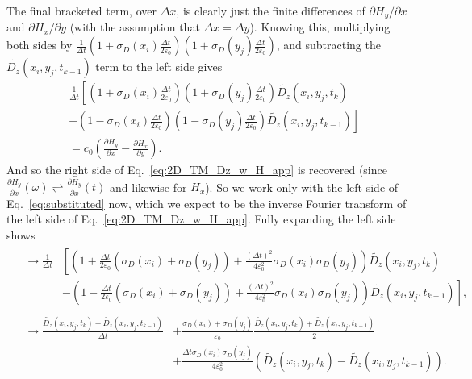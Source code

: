 \documentclass[12pt]{article}
\begin{document}
The final bracketed term, over $\Delta x$, is clearly just the finite differences of $\partial H_y/\partial x$ and $\partial H_x/\partial y$ (with the assumption that $\Delta x = \Delta y$). Knowing this, multiplying both sides by $\frac{1}{\Delta t}\left(1+\sigma_D(x_i)\frac{\Delta t}{2\varepsilon_0}\right)\left(1+\sigma_D(y_j)\frac{\Delta t}{2\varepsilon_0}\right)$, and subtracting the $\tilde{D_z}(x_i,y_j,t_{k-1})$ term to the left side gives
\begin{equation}
\label{eq:substituted}
\begin{split}
&\frac{1}{\Delta t}\left[\left(1+\sigma_D(x_i)\frac{\Delta t}{2\varepsilon_0}\right)\left(1+\sigma_D(y_j)\frac{\Delta t}{2\varepsilon_0}\right)\tilde{D_z}(x_i,y_j,t_k)\right. \\
&\left.- \left(1-\sigma_D(x_i)\frac{\Delta t}{2\varepsilon_0}\right)\left(1-\sigma_D(y_j)\frac{\Delta t}{2\varepsilon_0}\right)\tilde{D_z}(x_i,y_j,t_{k-1})\right]\\
& = c_0\left(\frac{\partial H_y}{\partial x}-\frac{\partial H_x}{\partial y}\right).
\end{split}
\end{equation}
And so the right side of Eq.~\ref{eq:2D_TM_Dz_w_H_app} is recovered (since $\frac{\partial H_y}{\partial x}(\omega) \rightleftharpoons \frac{\partial H_y}{\partial x}(t)$ and likewise for $H_x$). So we work only with the left side of Eq.~\ref{eq:substituted} now, which we expect to be the inverse Fourier transform of the left side of Eq.~\ref{eq:2D_TM_Dz_w_H_app}. Fully expanding the left side shows
\begin{align*}
&\begin{aligned}
\rightarrow\frac{1}{\Delta t}&\left[\left(1+\frac{\Delta t}{2\varepsilon_0}\left(\sigma_D(x_i)+\sigma_D(y_j)\right)+\frac{\left(\Delta t\right)^2}{4\varepsilon_0^2}\sigma_D(x_i)\sigma_D(y_j)\right)\tilde{D_z}(x_i,y_j,t_k)\right.\\
&\left.-\left(1-\frac{\Delta t}{2\varepsilon_0}\left(\sigma_D(x_i)+\sigma_D(y_j)\right)+\frac{\left(\Delta t\right)^2}{4\varepsilon_0^2}\sigma_D(x_i)\sigma_D(y_j)\right)\tilde{D_z}(x_i,y_j,t_{k-1})\right],
\end{aligned}\\
&\begin{aligned}
\rightarrow \frac{\tilde{D_z}(x_i,y_j,t_k)-\tilde{D_z}(x_i,y_j,t_{k-1})}{\Delta t} &+ \frac{\sigma_D(x_i)+\sigma_D(y_j)}{\varepsilon_0}\frac{\tilde{D_z}(x_i,y_j,t_k)+\tilde{D_z}(x_i,y_j,t_{k-1})}{2}\\
& + \frac{\Delta t \sigma_D(x_i)\sigma_D(y_j)}{4\varepsilon_0^2}\left(\tilde{D_z}(x_i,y_j,t_k)-\tilde{D_z}(x_i,y_j,t_{k-1})\right).
\end{aligned}
\end{align*}
\end{document}
